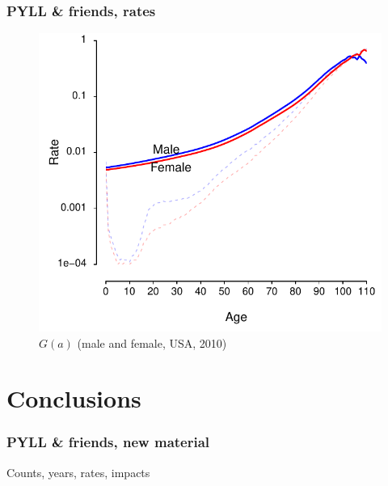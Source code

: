 \documentclass{beamer}
\begin{document}
\begin{frame}
\frametitle{PYLL \& friends, rates}
\vspace{-1cm}
\begin{figure}[b]
    \centering
    \includegraphics[scale=.7]{Figures/f14_linerate.pdf}
    \caption{$G(a)$ (male and female, USA, 2010)}
\end{figure} 
\end{frame}

\section{Conclusions}
\begin{frame}
\frametitle{PYLL \& friends, new material}

Counts, years, rates, impacts

\end{frame}
\end{document}
